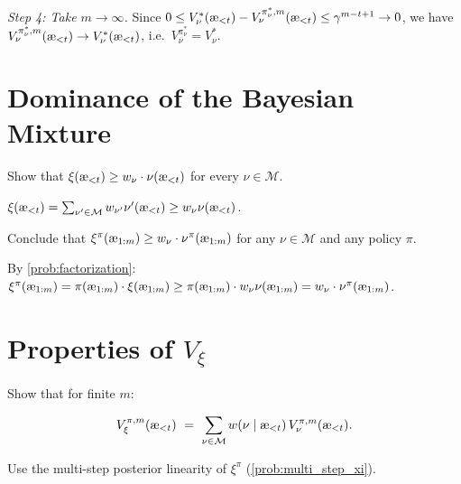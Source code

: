 \documentclass[fontsize=11pt, parskip=half]{scrartcl}
\newcommand{\cM}{\mathcal{M}}
\newcommand{\aes}{\textnormal{\ae}}
\begin{document}
\begin{solution}
\emph{Step 4: Take $m \to \infty$.}
Since $0 \leq V_\nu^*(\aes_{<t}) - V_\nu^{\pi_\nu^*,m}(\aes_{<t}) \leq \gamma^{m-t+1} \to 0$,
we have $V_\nu^{\pi_\nu^*,m}(\aes_{<t}) \to V_\nu^*(\aes_{<t})$, i.e.\ $V_\nu^{\pi_\nu^*} = V_\nu^*$.
\end{solution}



\section{Dominance of the Bayesian Mixture}\label{prob:dominance}

\begin{exercise}
\label{prob:auto1}
Show that $\xi(\aes_{<t}) \geq w_\nu \cdot \nu(\aes_{<t})$ for every $\nu \in \cM$.

\end{exercise}

\begin{solution}
$\xi(\aes_{<t}) = \sum_{\nu' \in \cM} w_{\nu'} \nu'(\aes_{<t}) \geq w_\nu \nu(\aes_{<t})$.
\end{solution}

\begin{exercise}
\label{prob:auto2}
Conclude that $\xi^\pi(\aes_{1:m}) \geq w_\nu \cdot \nu^\pi(\aes_{1:m})$ for any $\nu \in \cM$ and any policy $\pi$.

\end{exercise}

\begin{solution}
By \cref{prob:factorization}: $\xi^\pi(\aes_{1:m}) = \pi(\aes_{1:m}) \cdot \xi(\aes_{1:m}) \geq \pi(\aes_{1:m}) \cdot w_\nu \nu(\aes_{1:m}) = w_\nu \cdot \nu^\pi(\aes_{1:m})$.
\end{solution}


\section[Properties of the Value Function]{Properties of $V_\xi$}\label{prob:linearity}

\begin{exercise}
\label{prob:linearity_finite}
Show that for finite $m$:

\[
    V_\xi^{\pi,m}(\aes_{<t})
    ~=~ \sum_{\nu \in \cM} w(\nu \mid \aes_{<t})\, V_\nu^{\pi,m}(\aes_{<t}).
\]

\begin{hint}
Use the multi-step posterior linearity of $\xi^\pi$ (\cref{prob:multi_step_xi}).
\end{hint}
\end{exercise}
\end{document}
